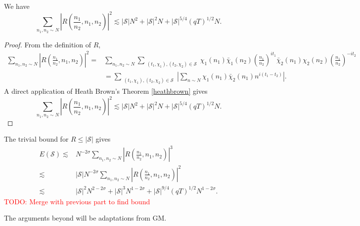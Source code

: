 \begin{lemma}
    We have 
\[
        \sum_{n_1,n_2\sim N}\left|R\left(\frac{n_1}{n_2},n_1,n_2\right) \right|^2\lesssim |\mathcal{S}|N^2+ |\mathcal{S}|^2N + |\mathcal{S}|^{5/4}(qT)^{1/2}N.
    \]
\end{lemma}
\begin{proof}
    From the definition of $R$, \begin{align*}
        \sum_{n_1,n_2\sim N}\left|R\left(\frac{n_1}{n_2},n_1,n_2\right) \right|^2=& \sum_{n_1,n_2\sim N}\sum_{\substack{(t_1,\chi_1),(t_2,\chi_2)\in \mathcal{S}}}
        \chi_1(n_1)\bar{\chi}_1(n_2)\left(\frac{n_1}{n_2}\right)^{it_1}\bar{\chi}_2(n_1){\chi}_2(n_2)\left(\frac{n_1}{n_2}\right)^{-it_2}
        \\
        &=\sum_{\substack{(t_1,\chi_1),(t_2,\chi_2)\in \mathcal{S}}}\left|\sum_{n\sim N}
        \chi_1(n_1)\bar{\chi}_2(n_1)n^{i(t_1-t_2)}\right|.
    \end{align*}
    A direct application of Heath Brown's Theorem \ref{heathbrown} gives \[
        \sum_{n_1,n_2\sim N}\left|R\left(\frac{n_1}{n_2},n_1,n_2\right) \right|^2\lesssim |\mathcal{S}|N^2+ |\mathcal{S}|^2N + |\mathcal{S}|^{5/4}(qT)^{1/2}N.
    \]
\end{proof}
The trivial bound for $R\leq |\mathcal{S}|$ gives \begin{align*}
    E(\mathcal{S})\lesssim& N^{-2\sigma}\sum_{n_1,n_2\sim N}\left|R\left(\frac{n_1}{n_2},n_1,n_2\right) \right|^3\\
    \lesssim &|\mathcal{S}|N^{-2\sigma}\sum_{n_1,n_2\sim N}\left|R\left(\frac{n_1}{n_2},n_1,n_2\right) \right|^2\\
    \lesssim& |\mathcal{S}|^2N^{2-2\sigma}+ |\mathcal{S}|^3N^{1-2\sigma} + |\mathcal{S}|^{9/4}(qT)^{1/2}N^{{1-2\sigma}}.
\end{align*}
\textcolor{red}{TODO: Merge with previous part to find bound}

The arguments beyond will be adaptations from GM. 

